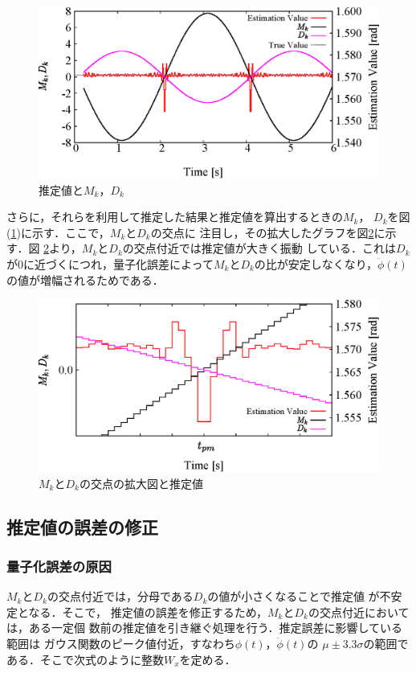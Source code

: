 \documentclass[a4paper,12pt]{jarticle}
\begin{document}
 \begin{figure}[h]
     \centering
  \includegraphics[scale=0.9]{check.eps}
 \caption{推定値と$M_k，D_k$}
 \label{check}
\end{figure}
さらに，それらを利用して推定した結果と推定値を算出するときの$M_k$，
$D_k$を図(\ref{check})に示す．ここで，$M_k$と$D_k$の交点に
注目し，その拡大したグラフを図\ref{checksinmini}に示す．図
\ref{checksinmini}より，$M_k$と$D_k$の交点付近では推定値が大きく振動
している．これは$D_k$が0に近づくにつれ，量子化誤差によって$M_k$と$D_k$の比が安定しなくなり，$\ddot{\phi}(t)$の値が増幅されるためである．
\begin{figure}[t]
 \centering
 \includegraphics[scale=0.9]{checkzoom.eps}
    \caption{$M_k$と$D_k$の交点の拡大図と推定値}
		\label{checksinmini}
\end{figure}
\subsection{推定値の誤差の修正}
\subsubsection{量子化誤差の原因}
$M_k$と$D_k$の交点付近では，分母である$D_k$の値が小さくなることで推定値
が不安定となる．そこで，
推定値の誤差を修正するため，$M_k$と$D_k$の交点付近においては，ある一定個
数前の推定値を引き継ぐ処理を行う．推定誤差に影響している範囲は
ガウス関数のピーク値付近，すなわち$\phi(t)$，$\ddot{\phi}(t)$の
$\mu\pm3.3\sigma$の範囲である\cite{toukei}．そこで次式のように整数$W_x$を定める．
\end{document}
